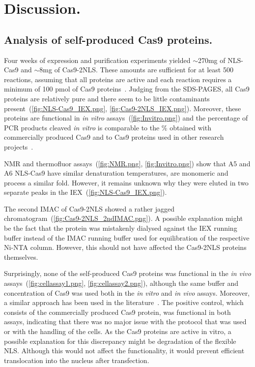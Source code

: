 \documentclass[11pt]{article}
\begin{document}
\newpage
\section{Discussion.}

\subsection{Analysis of self-produced Cas9 proteins.}
Four weeks of expression and purification experiments yielded $\sim$270mg of NLS-Cas9 and $\sim$8mg of Cas9-2NLS. These amounts are sufficient for at least 500 reactions, assuming that all proteins are active and each reaction requires a minimum of 100 pmol of Cas9 proteins~\citep{Lin2014b}. Judging from the SDS-PAGES, all Cas9 proteins are relatively pure and there seem to be little contaminants present~(\autoref{fig:NLS-Cas9_IEX.png}, \autoref{fig:Cas9-2NLS_IEX.png}). Moreover, these proteins are functional in \textit{in vitro} assays~(\autoref{fig:Invitro.png}) and the percentage of PCR products cleaved \textit{in vitro} is comparable to the \% obtained with commercially produced Cas9 and to Cas9 proteins used in other research projects~\citep{Jinek2012a}.

NMR and thermofluor assays~(\autoref{fig:NMR.png}, \autoref{fig:Invitro.png}) show that A5 and A6 NLS-Cas9 have similar denaturation temperatures, are monomeric and process a similar fold. However, it remains unknown why they were eluted in two separate peaks in the IEX~(\autoref{fig:NLS-Cas9_IEX.png}).

The second IMAC of Cas9-2NLS showed a rather jagged chromatogram~(\autoref{fig:Cas9-2NLS_2ndIMAC.png}). A possible explanation might be the fact that the protein was mistakenly dialysed against the IEX running buffer instead of the IMAC running buffer used for equilibration of the respective Ni-NTA column. However, this should not have affected the Cas9-2NLS proteins themselves.

Surprisingly, none of the self-produced Cas9 proteins was functional in the \textit{in vivo} assays~(\autoref{fig:cellassay1.png}, \autoref{fig:cellassay2.png}), although the same buffer and concentration of Cas9 was used both in the \textit{in vitro} and \textit{in vivo} assays. Moreover, a similar approach has been used in the literature~\citep{Zuris2014}. The positive control, which consists of the commercially produced Cas9 protein, was functional in both assays, indicating that there was no major issue with the protocol that was used or with the handling of the cells. As the Cas9 proteins are active in vitro, a possible explanation for this discrepancy might be degradation of the flexible NLS. Although this would not affect the functionality, it would prevent efficient translocation into the nucleus after transfection.
\end{document}
